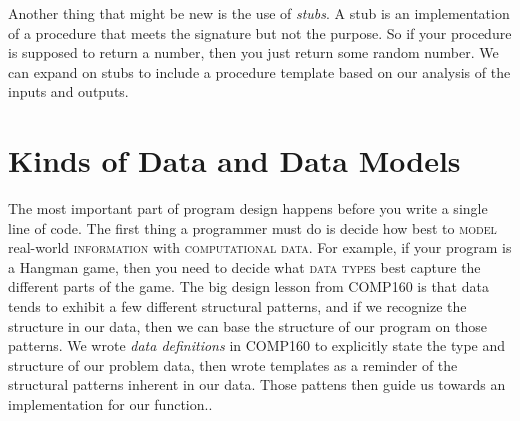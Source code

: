 \documentclass[]{tufte-handout}
\begin{document}
Another thing that might be new is the use of \textit{stubs}. A stub is an implementation of a procedure that meets the signature but not the purpose. So if your procedure is supposed to return a number, then you just return some random number. We can expand on stubs to include a procedure template based on our analysis of the inputs and outputs.   

\section{Kinds of Data and Data Models}

The most important part of program design happens before you write a single line of code.  The first thing a programmer must do is decide how best to \textsc{model} real-world \textsc{information} with \textsc{computational data}. For example, if your program is a Hangman game, then you need to decide what \textsc{data types} best capture the different parts of the game. The big design lesson from COMP160 is that data tends to exhibit a few different structural patterns, and if we recognize the structure in our data, then we can base the structure of our program on those patterns. We wrote \textit{data definitions} in COMP160 to explicitly state the type and structure of our problem data, then wrote templates as a reminder of the structural patterns inherent in our data. Those pattens then guide us towards an implementation for our function.. 
\end{document}
